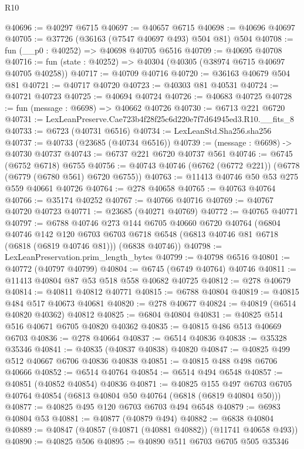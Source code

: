 \begin{lexlean}{R10}
\begin{coremodule}
@40696 := @40297 @6715
@40697 := @40657 @6715
@40698 := @40696 @40697
@40705 := @37726 (@36163 (@7547 @40697 @493) @504 @81) @504
@40708 := fun (__p0 : @40252) => @40698 @40705 @6516
@40709 := @40695 @40708
@40716 := fun (state : @40252) => @40304 (@40305 (@38974 @6715 @40697 @40705 @40258))
@40717 := @40709 @40716
@40720 := @36163 @40679 @504 @81
@40721 := @40717 @40720
@40723 := @40303 @81 @40531
@40724 := @40721 @40723
@40725 := @40694 @40724
@40726 := @40683 @40725
@40728 := fun (message : @6698) => @40662 @40726
@40730 := @6713 @221 @6720
@40731 := LexLeanPreserve.Cae723b4f28f25c6d220e7f7d64945ed3.R10.__fits_8
@40733 := @6723 (@40731 @6516)
@40734 := LexLeanStd.Sha256.sha256
@40737 := @40733 (@23685 (@40734 @6516))
@40739 := (message : @6698) -> @40730 @40737
@40743 := @6737 @221 @6720 @40737 @561
@40746 := @6745 (@6752 @6718) @6755
@40756 := @40743 @40746 (@6762 (@6772 @221)) (@6778 (@6779 (@6780 @561) @6720 @6755))
@40763 := @11413 @40746 @50 @53 @275 @559 @40661 @40726
@40764 := @278 @40658
@40765 := @40763 @40764
@40766 := @35174 @40252
@40767 := @40766 @40716
@40769 := @40767 @40720 @40723
@40771 := @23685 (@40271 @40769)
@40772 := @40765 @40771
@40797 := @6788
    @40746
    @273
    @144
    @6705
    @40660
    @6720
    @40764
    (@6804
      @40746
      @142
      @120
      @6703
      @6703
      @6718
      @6548
      (@6813 @40746 @81 @6718 (@6818 (@6819 @40746 @81)))
      (@6838 @40746))
@40798 := LexLeanPreservation.prim_length_bytes
@40799 := @40798 @6516
@40801 := @40772 (@40797 @40799)
@40804 := @6745 (@6749 @40764) @40746
@40811 := @11413 @40804 @87 @53 @518 @558 @40682 @40725
@40812 := @278 @40679
@40814 := @40811 @40812 @40771
@40815 := @6788 @40804
@40819 := @40815 @484 @517 @40673 @40681
@40820 := @278 @40677
@40824 := @40819 (@6514 @40820 @40362) @40812
@40825 := @6804 @40804
@40831 := @40825 @514 @516 @40671 @6705 @40820 @40362
@40835 := @40815 @486 @513 @40669 @6703
@40836 := @278 @40664
@40837 := @6514 @40836
@40838 := @35328 @35346
@40841 := @40835 (@40837 @40838) @40820
@40847 := @40825 @499 @512 @40667 @6706 @40836 @40838
@40851 := @40815 @488 @498 @6706 @40666
@40852 := @6514 @40764
@40854 := @6514 @494 @6548
@40857 := @40851 (@40852 @40854) @40836
@40871 := @40825
    @155
    @497
    @6703
    @6705
    @40764
    @40854
    (@6813 @40804 @50 @40764 (@6818 (@6819 @40804 @50)))
@40877 := @40825 @495 @120 @6703 @6703 @494 @6548
@40879 := @6983 @40804 @53
@40881 := @40877 (@40879 @494)
@40882 := @6838 @40804
@40889 := @40847 (@40857 (@40871 (@40881 @40882)) (@11741 @40658 @493))
@40890 := @40825 @506
@40895 := @40890 @511 @6703 @6705 @505 @35346

\end{coremodule}
\end{lexlean}
